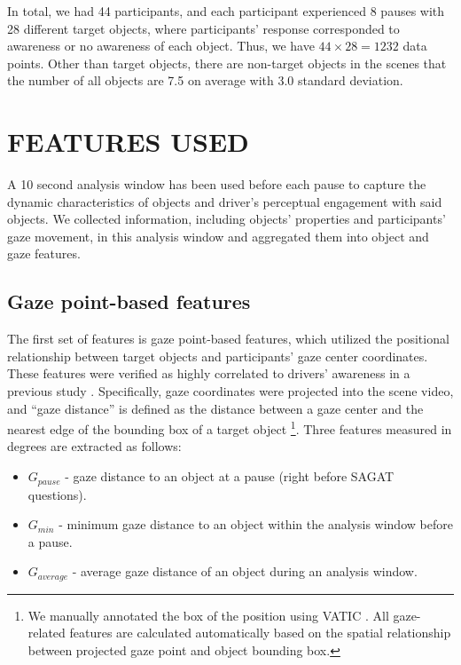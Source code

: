 \documentclass[letterpaper, 10 pt, conference]{ieeeconf}  %
\begin{document}
In total, we had 44 participants, and each participant experienced 8 pauses with 28 different target objects, where participants' response corresponded to awareness or no awareness of each object. Thus, we have $44\times28=1232$ data points. Other than target objects, there are non-target objects in the scenes that the number of all objects are 7.5 on average with 3.0 standard deviation.


\section{FEATURES USED}

A 10 second analysis window has been used before each pause to capture the dynamic characteristics of objects and driver's perceptual engagement with said objects. We collected information, including objects' properties and participants' gaze movement, in this analysis window and aggregated them into object and gaze features.

\subsection{Gaze point-based features}

The first set of features is gaze point-based features, which utilized the positional relationship between target objects and participants' gaze center coordinates. These features were verified as highly correlated to drivers' awareness in a previous study \cite{kim2020toward}. Specifically, gaze coordinates were projected into the scene video, and ``gaze distance'' is defined as the distance between a gaze center and the nearest edge of the bounding box of a target object \footnote{We manually annotated the box of the position using VATIC \cite{vondrick2013efficiently}. All gaze-related features are calculated automatically based on the spatial relationship between projected gaze point and object bounding box.}. Three features measured in degrees are extracted as follows:

\begin{itemize}
    \item $G_{pause}$ - gaze distance to an object at a pause (right before SAGAT questions).
    \item $G_{min}$ - minimum gaze distance to an object within the analysis window before a pause.
    \item $G_{average}$ - average gaze distance of an object during an analysis window.
\end{itemize}
\end{document}
